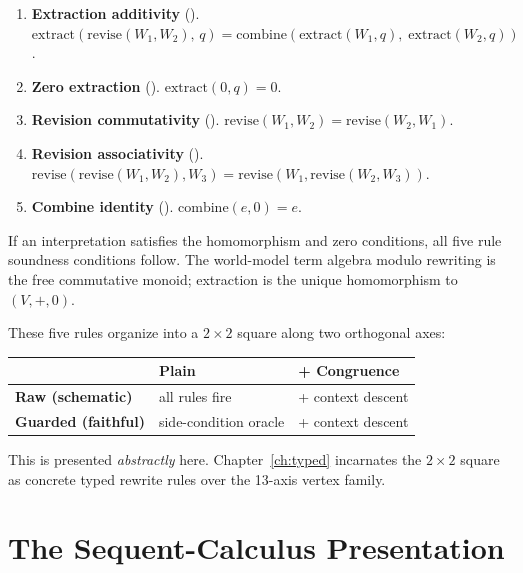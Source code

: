 \documentclass[11pt,openany]{report}
\begin{document}
\begin{enumerate}
\item \textbf{Extraction additivity} (\claimCore{}).
  $\mathrm{extract}(\mathrm{revise}(W_1, W_2),\, q)
  = \mathrm{combine}(\mathrm{extract}(W_1, q),\;
                       \mathrm{extract}(W_2, q))$.

\item \textbf{Zero extraction} (\claimCore{}).
  $\mathrm{extract}(0, q) = 0$.

\item \textbf{Revision commutativity} (\claimCore{}).
  $\mathrm{revise}(W_1, W_2) = \mathrm{revise}(W_2, W_1)$.

\item \textbf{Revision associativity} (\claimCore{}).
  $\mathrm{revise}(\mathrm{revise}(W_1, W_2), W_3)
  = \mathrm{revise}(W_1, \mathrm{revise}(W_2, W_3))$.

\item \textbf{Combine identity} (\claimCore{}).
  $\mathrm{combine}(e, 0) = e$.
\end{enumerate}

\begin{theorem}
\label{thm:algebraic-core}
If an interpretation satisfies the homomorphism and zero conditions, all
five rule soundness conditions follow.  The world-model term algebra
modulo rewriting is the free commutative monoid; extraction is the
unique homomorphism to $(V, +, 0)$.
\end{theorem}

\noindent
These five rules organize into a $2 \times 2$ square along two
orthogonal axes:

\begin{center}
\begin{tabular}{lll}
\toprule
& \textbf{Plain} & \textbf{+ Congruence} \\
\midrule
\textbf{Raw (schematic)} & all rules fire & + context descent \\
\textbf{Guarded (faithful)} & side-condition oracle & + context descent \\
\bottomrule
\end{tabular}
\end{center}

\noindent
This is presented \emph{abstractly} here.
Chapter~\ref{ch:typed} incarnates the $2 \times 2$ square as
concrete typed rewrite rules over the 13-axis vertex family.


\section{The Sequent-Calculus Presentation}
\end{document}
